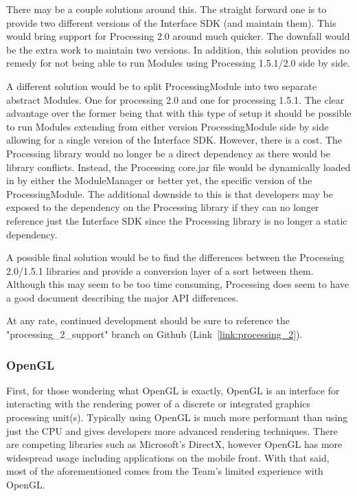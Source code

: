 \documentclass[11pt,letterpaper]{article}
\begin{document}
	There may be a couple solutions around this. The straight forward one is to
	provide two different versions of the Interface SDK (and maintain them). This
	would bring support for Processing 2.0 around much quicker. The downfall would
	be the extra work to maintain two versions. In addition, this solution
	provides no remedy for not being able to run Modules using Processing
	1.5.1/2.0 side by side.

	A different solution would be to split ProcessingModule into two separate
	abstract Modules.  One for processing 2.0 and one for processing 1.5.1.  The
	clear advantage over the former being that with this type of setup it should
	be possible to run Modules extending from either version ProcessingModule side
	by side allowing for a single version of the Interface SDK.  However, there is
	a cost.  The Processing library would no longer be a direct dependency as
	there would be library conflicts.  Instead, the Processing core.jar file would
	be dynamically loaded in by either the ModuleManager or better yet, the
	specific version of the ProcessingModule. The additional downside to this is
	that developers may be exposed to the dependency on the Processing library if
	they can no longer reference just the Interface SDK since the Processing
	library is no longer a static dependency.

	A possible final solution would be to find the differences between the
	Processing 2.0/1.5.1 libraries and provide a conversion layer of a sort
	between them. Although this may seem to be too time consuming, Processing does
	seem to have a good document describing the major API differences.

	At any rate, continued development should be sure to reference the
	"processing\_2\_support" branch on Github (Link~\ref{link:processing_2}).

	\subsubsection{OpenGL} 
	\label{sec:cont_dev_opengl}
	First, for those wondering what OpenGL is exactly, OpenGL is an interface for
	interacting with the rendering power of a discrete or integrated graphics
	processing unit(s).  Typically using OpenGL is much more performant than using
	just the CPU and gives developers more advanced rendering techniques. There
	are competing libraries such as Microsoft's DirectX, however OpenGL has more
	widespread usage including applications on the mobile front.  With that said,
	most of the aforementioned comes from the Team's limited experience with
	OpenGL.  
\end{document}

